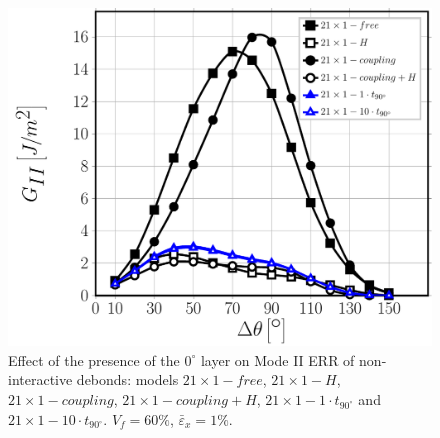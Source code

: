 \documentclass[Review,sagev,times]{sagej}
\begin{document}
\begin{figure}[!htb]
\centering
\includegraphics[height=0.375\textheight]{nx1-1-vf60-GII.pdf}
\caption{Effect of the presence of the $0^{\circ}$ layer on Mode II ERR of non-interactive debonds: models $21\times 1-free$, $21\times 1-H$, $21\times 1-coupling$, $21\times 1-coupling+H$, $21\times 1-1\cdot t_{90^{\circ}}$ and $21\times 1-10\cdot t_{90^{\circ}}$. $V_{f}=60\%$, $\bar{\varepsilon}_{x}=1\%$.}\label{fig:debonddebondGII}
\end{figure}
\end{document}
